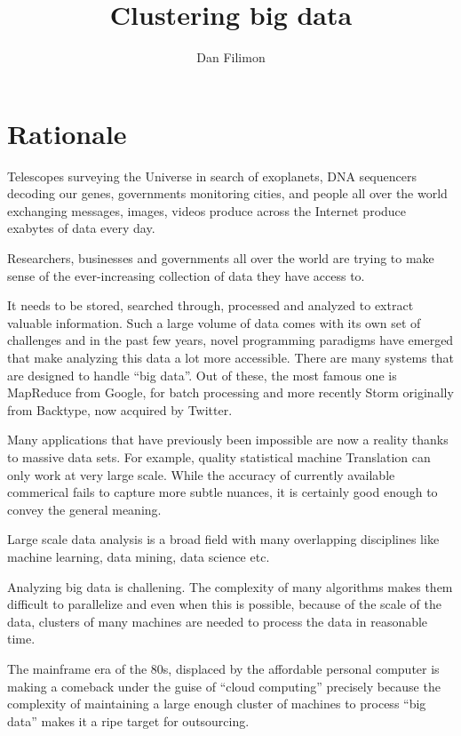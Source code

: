 \documentclass{article}
\title{Clustering big data}
\author{Dan Filimon}
\begin{document}
\maketitle

\tableofcontents

\pagebreak

\section{Rationale}

Telescopes surveying the Universe in search of exoplanets, DNA sequencers
decoding our genes, governments monitoring cities, and people all over the
world exchanging messages, images, videos produce across the Internet produce
exabytes of data every day.

Researchers, businesses and governments all over the world are trying to make
sense of the ever-increasing collection of data they have access to.

It needs to be stored, searched through, processed and analyzed to extract
valuable information.
Such a large volume of data comes with its own set of challenges and in the
past few years, novel programming paradigms have emerged that make analyzing
this data a lot more accessible.
There are many systems that are designed to handle ``big data''. Out of these, the most famous one is MapReduce \cite{mr1} from Google, for batch
processing and more recently Storm \cite{st1} originally from Backtype, now acquired by
Twitter.

Many applications that have previously been impossible are now a reality thanks
to massive data sets. For example, quality statistical machine Translation can only
work at very large scale. While the accuracy of currently available commerical
fails to capture more subtle nuances, it is certainly good enough to convey the
general meaning.

Large scale data analysis is a broad field with many overlapping disciplines
like machine learning, data mining, data science etc.

Analyzing big data is challening. The complexity of many algorithms makes them
difficult to parallelize and even when this is possible, because of the scale
of the data, clusters of many machines are needed to process the data in
reasonable time.

The mainframe era of the 80s, displaced by the affordable
personal computer is making a comeback under the guise of ``cloud computing''
precisely because the complexity of maintaining a large enough cluster of machines
to process ``big data'' makes it a ripe target for outsourcing.
\end{document}
